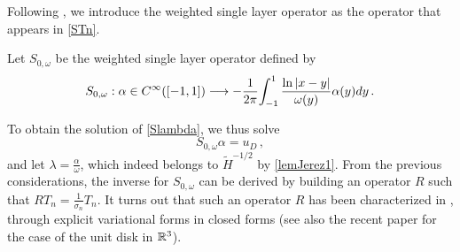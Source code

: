 \documentclass[a4paper]{article}
\begin{document}
\noindent Following \cite{bruno2012second}, we introduce the weighted single layer operator as the operator 
that appears in \autoref{STn}.
\begin{Def}
	Let $S_{0,\omega}$ be the weighted single layer operator defined by
	\[S_{0,\omega} : \alpha \in C^{\infty}([-1,1]) \longrightarrow -\dfrac{1}{2\pi}{\int_{-1}^1\dfrac{\ln|x-y|}{\omega(y)} \alpha(y)dy}\,.\]
\end{Def}
\noindent To obtain the solution of \eqref{Slambda}, we thus solve 
\begin{equation}
	S_{0,\omega} \alpha = u_D\,,
	\label{Somegaalpha}
\end{equation}
and let $\lambda = \frac{\alpha}{\omega}$, which indeed belongs to $\tilde{H}^{-1/2}$ by \eqref{lemJerez1}. From the previous 
considerations, the inverse for $S_{0,\omega}$ can be derived by building an operator $R$ such that $RT_n = \frac{1}{\sigma_n}T_n$. 
It turns out that such an operator $R$ has been characterized in \cite{jerez2012explicit,urzua2014optimal}, through explicit 
variational forms in closed forms (see also the recent paper \cite{hiptmair2017closed}  
for the case of the unit disk in $\mathbb{R}^3$). 
\end{document}
